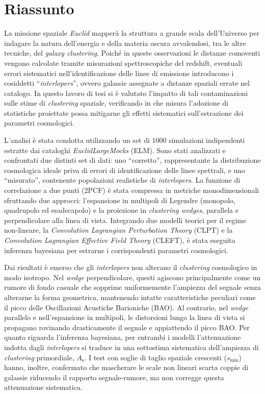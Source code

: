 \documentclass[11pt,a4paper]{article}
\begin{document}
\section*{Riassunto}
La missione spaziale \textit{Euclid} mapperà la struttura a grande scala dell'Universo per indagare la natura dell'energia e della materia oscura avvalendosi, tra le altre tecniche, del \textit{galaxy clustering}. Poiché in queste osservazioni le distanze comoventi vengono calcolate tramite misurazioni spettroscopiche del redshift, eventuali errori sistematici nell'identificazione delle linee di emissione introducono i cosiddetti “\textit{interlopers}”, ovvero galassie assegnate a distanze spaziali errate nel catalogo. In questo lavoro di tesi si è valutato l'impatto di tali contaminazioni sulle stime di \textit{clustering} spaziale, verificando in che misura l'adozione di statistiche proiettate possa mitigarne gli effetti sistematici sull'estrazione dei parametri cosmologici.

L'analisi è stata condotta utilizzando un set di $1000$ simulazioni indipendenti estratte dai cataloghi \textit{EuclidLargeMocks} (ELM). Sono stati analizzati e confrontati due distinti set di dati: uno “corretto”, rappresentante la distribuzione cosmologica ideale priva di errori di identificazione delle linee spettrali, e uno “misurato”, contenente popolazioni realistiche di \textit{interlopers}. La funzione di correlazione a due punti (2PCF) è stata compressa in metriche monodimensionali sfruttando due approcci: l'espansione in multipoli di Legendre (monopolo, quadrupolo ed esadecapolo) e la proiezione in \textit{clustering wedges}, parallela e perpendicolare alla linea di vista. Integrando due modelli teorici per il regime non-lineare, la \textit{Convolution Lagrangian Perturbation Theory} (CLPT) e la \textit{Convolution Lagrangian Effective Field Theory} (CLEFT), è stata eseguita inferenza bayesiana per estrarne i corrispondenti parametri cosmologici.

Dai risultati è emerso che gli \textit{interlopers} non alterano il \textit{clustering} cosmologico in modo isotropo. Nel \textit{wedge} perpendicolare, questi agiscono principalmente come un rumore di fondo casuale che sopprime uniformemente l'ampiezza del segnale senza alterarne la forma geometrica, mantenendo intatte caratteristiche peculiari come il picco delle Oscillazioni Acustiche Barioniche (BAO). Al contrario, nel \textit{wedge} parallelo e nell'espansione in multipoli, le distorsioni lungo la linea di vista si propagano rovinando drasticamente il segnale e appiattendo il picco BAO. Per quanto riguarda l'inferenza bayesiana, per entrambi i modelli l'attenuazione indotta dagli \textit{interlopers} si traduce in una sottostima sistematica dell'ampiezza di \textit{clustering} primordiale, $A_\text{s}$. I test con soglie di taglio spaziale crescenti ($s_\text{min}$) hanno, inoltre, confermato che mascherare le scale non lineari scarta coppie di galassie riducendo il rapporto segnale-rumore, ma non corregge questa attenuazione sistematica.
\end{document}
